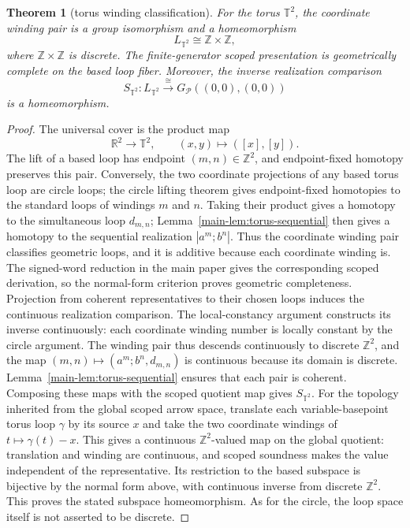 \documentclass[10pt,reqno]{amsart}
\theoremstyle{definition}
\theoremstyle{plain}
\newtheorem{theorem}[definition]{Theorem}
\theoremstyle{remark}
\newcommand{\Z}{\mathbb Z}
\begin{document}
\begin{theorem}[torus winding classification]
\label{thm:torus-winding}
For the torus $\mathbb T^2$, the coordinate winding pair is a group
isomorphism and a homeomorphism
\[
  L_{\mathbb T^2}\cong\Z\times\Z,
\]
where $\Z\times\Z$ is discrete.
The finite-generator scoped presentation is geometrically complete on the
based loop fiber.  Moreover, the inverse realization comparison
\[
  S_{\mathbb T^2}:L_{\mathbb T^2}\xrightarrow{\ \cong\ }
  G_{\mathcal P}((0,0),(0,0))
\]
is a homeomorphism.
\end{theorem}

\begin{proof}
The universal cover is the product map
\[
  \mathbb R^2\longrightarrow\mathbb T^2,
  \qquad (x,y)\longmapsto([x],[y]).
\]
The lift of a based loop has endpoint $(m,n)\in\mathbb Z^2$, and endpoint-fixed
homotopy preserves this pair.  Conversely, the two coordinate projections of
any based torus loop are circle loops; the circle lifting theorem gives
endpoint-fixed homotopies to the standard loops of windings $m$ and $n$.
Taking their product gives a homotopy to the simultaneous loop $d_{m,n}$;
Lemma~\ref{main-lem:torus-sequential} then gives a homotopy to the sequential
realization $|a^m;b^n|$.  Thus the coordinate winding pair classifies
geometric loops, and it is additive because each coordinate winding is.  The signed-word reduction in the main paper gives the corresponding scoped
derivation, so the normal-form criterion proves geometric completeness.
Projection from coherent representatives to their chosen loops induces
the continuous realization comparison.  The local-constancy argument
constructs its inverse continuously: each coordinate
winding number is locally constant by the circle argument.  The winding pair thus
descends continuously to discrete $\Z^2$, and the map
$(m,n)\mapsto(a^m;b^n,d_{m,n})$ is continuous because its domain is discrete.
Lemma~\ref{main-lem:torus-sequential} ensures that each pair is coherent.
Composing these maps with the scoped quotient map gives $S_{\mathbb T^2}$.
For the topology inherited from the global scoped arrow space, translate
each variable-basepoint torus loop $\gamma$ by its source $x$ and take the
two coordinate windings of $t\mapsto\gamma(t)-x$. This gives a continuous
$\mathbb Z^2$-valued map on the global quotient: translation and winding
are continuous, and scoped soundness makes the value independent of the
representative. Its restriction to the based subspace is bijective by the
normal form above, with continuous inverse from discrete $\mathbb Z^2$.
This proves the stated subspace homeomorphism. As for the circle, the
loop space itself is not asserted to be discrete.
\end{proof}
\end{document}
